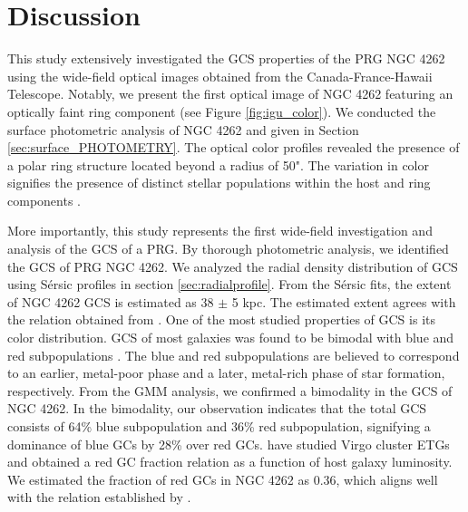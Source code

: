 \documentclass[fleqn,usenatbib]{mnras}
\begin{document}
\section{Discussion}
\label{sec:discussion}
This study extensively investigated the GCS properties of the PRG NGC 4262 using the wide-field optical images obtained from the Canada-France-Hawaii Telescope. Notably, we present the first optical image of NGC 4262 featuring an optically faint ring component (see Figure \ref{fig:igu_color}). We conducted the surface photometric analysis of NGC 4262 and given in Section \ref{sec:surface_PHOTOMETRY}. The optical color profiles revealed the presence of a polar ring structure located beyond a radius of 50". The variation in color signifies the presence of distinct stellar populations within the host and ring components \citep{2024akr}. \par


More importantly, this study represents the first wide-field investigation and analysis of the GCS of a PRG. By thorough photometric analysis, we identified the GCS of PRG NGC 4262. We analyzed the radial density distribution of GCS using Sérsic profiles in section \ref{sec:radialprofile}. From the Sérsic fits, the extent of NGC 4262 GCS is estimated as 38 $\pm$ 5 kpc. The estimated extent agrees with the relation obtained from \citet{sreeja2014}. One of the most studied properties of GCS is its color distribution. GCS of most galaxies was found to be bimodal with blue and red subpopulations \citep{Peng2006,2015Harris_hudson,Hagrisrhode2014,2020debrotoli}. The blue and red subpopulations are believed to correspond to an earlier, metal-poor phase and a later, metal-rich phase of star formation, respectively. From the GMM analysis, we confirmed a bimodality in the GCS of NGC 4262. In the bimodality, our observation indicates that the total GCS consists of 64\% blue subpopulation and 36\% red subpopulation, signifying a dominance of blue GCs by 28\% over red GCs. \citet{2008peng} have studied Virgo cluster ETGs and obtained a red GC fraction relation as a function of host galaxy luminosity. We estimated the fraction of red GCs in NGC 4262 as 0.36, which aligns well with the relation established by \citet{2008peng}.  \par
\end{document}
